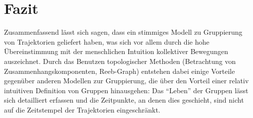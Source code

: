 \section{Fazit}
Zusammenfassend lässt sich sagen, dass \textcite{buchin2015} ein stimmiges Modell zu Gruppierung von Trajektorien geliefert haben, was sich vor allem durch die hohe Übereinstimmung mit der menschlichen Intuition kollektiver Bewegungen auszeichnet.
Durch das Benutzen topologischer Methoden (Betrachtung von Zusammenhangskomponenten, Reeb-Graph) entstehen dabei einige Vorteile gegenüber anderen Modellen zur Gruppierung, die über den Vorteil einer relativ intuitiven Definition von Gruppen hinausgehen: Das \enquote{Leben} der Gruppen lässt sich detailliert erfassen und die Zeitpunkte, an denen dies geschieht, sind nicht auf die Zeitstempel der Trajektorien eingeschränkt.
